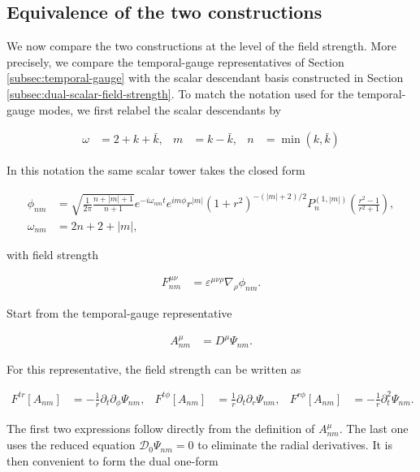 \subsection{Equivalence of the two constructions}\label{subsec:equivalence-two-constructions}

We now compare the two constructions at the level of the field strength. More precisely, we compare the temporal-gauge representatives of Section \ref{subsec:temporal-gauge} with the scalar descendant basis constructed in Section \ref{subsec:dual-scalar-field-strength}. To match the notation used for the temporal-gauge modes, we first relabel the scalar descendants by

\begin{align}
\omega&=2+k+\bar{k}, &m&=k-\bar{k}, & n&=\min(k,\bar{k})
\end{align}

In this notation the same scalar tower takes the closed form

\begin{align}
\phi_{nm}&=\sqrt{\frac{1}{2\pi}\frac{n+|m|+1}{n+1}}e^{-i\omega_{nm}t}e^{im\phi}r^{|m|}(1+r^{2})^{-(|m|+2)/2}P_{n}^{(1,|m|)}\left(\frac{r^{2}-1}{r^{2}+1}\right), \\
\omega_{nm}&=2n+2+|m|,
\end{align}

with field strength

\begin{align}
F_{nm}^{\mu\nu}&=\varepsilon^{\mu\nu\rho}\nabla_{\rho}\phi_{nm}.
\end{align}

Start from the temporal-gauge representative

\begin{align}
A_{nm}^{\mu}&=D^{\mu}\Psi_{nm}.
\end{align}

For this representative, the field strength can be written as

\begin{align}
F^{tr}[A_{nm}]&=-\frac{1}{r}\partial_{t}\partial_{\phi}\Psi_{nm}, &
F^{t\phi}[A_{nm}]&=\frac{1}{r}\partial_{t}\partial_{r}\Psi_{nm}, &
F^{r\phi}[A_{nm}]&=-\frac{1}{r}\partial_{t}^{2}\Psi_{nm}.
\end{align}

The first two expressions follow directly from the definition of $A_{nm}^{\mu}$. The last one uses the reduced equation $\mathcal{D}_{0}\Psi_{nm}=0$ to eliminate the radial derivatives. It is then convenient to form the dual one-form

